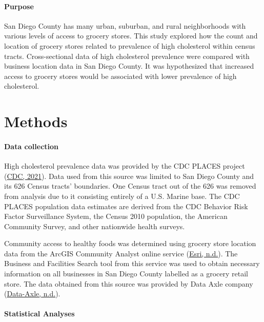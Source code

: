 \documentclass[]{elsarticle} %
\begin{document}
\hypertarget{purpose}{%
\paragraph{Purpose}\label{purpose}}

San Diego County has many urban, suburban, and rural neighborhoods with
various levels of access to grocery stores. This study explored how the
count and location of grocery stores related to prevalence of high
cholesterol within census tracts. Cross-sectional data of high
cholesterol prevalence were compared with business location data in San
Diego County. It was hypothesized that increased access to grocery
stores would be associated with lower prevalence of high cholesterol.

\hypertarget{methods}{%
\section{Methods}\label{methods}}

\hypertarget{data-collection}{%
\paragraph{Data collection}\label{data-collection}}

High cholesterol prevalence data was provided by the CDC PLACES project
(\protect\hyperlink{ref-cdc2021}{CDC, 2021}). Data used from this source
was limited to San Diego County and its 626 Census tracts' boundaries.
One Census tract out of the 626 was removed from analysis due to it
consisting entirely of a U.S. Marine base. The CDC PLACES population
data estimates are derived from the CDC Behavior Risk Factor
Surveillance System, the Census 2010 population, the American Community
Survey, and other nationwide health surveys.

Community access to healthy foods was determined using grocery store
location data from the ArcGIS Community Analyst online service
(\protect\hyperlink{ref-esri2021}{Esri, n.d.}). The Business and
Facilities Search tool from this service was used to obtain necessary
information on all businesses in San Diego County labelled as a grocery
retail store. The data obtained from this source was provided by Data
Axle company (\protect\hyperlink{ref-dataaxle2021}{Data-Axle, n.d.}).

\hypertarget{statistical-analyses}{%
\paragraph{Statistical Analyses}\label{statistical-analyses}}
\end{document}
